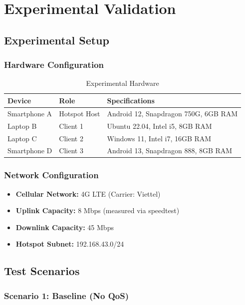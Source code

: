 \chapter{Experimental Validation}
\label{ch:validation}

\section{Experimental Setup}

\subsection{Hardware Configuration}

\begin{table}[htbp]
\centering
\caption{Experimental Hardware}
\begin{tabular}{@{}lll@{}}
\toprule
\textbf{Device} & \textbf{Role} & \textbf{Specifications} \\
\midrule
Smartphone A & Hotspot Host & Android 12, Snapdragon 750G, 6GB RAM \\
Laptop B & Client 1 & Ubuntu 22.04, Intel i5, 8GB RAM \\
Laptop C & Client 2 & Windows 11, Intel i7, 16GB RAM \\
Smartphone D & Client 3 & Android 13, Snapdragon 888, 8GB RAM \\
\bottomrule
\end{tabular}
\end{table}

\subsection{Network Configuration}

\begin{itemize}
    \item \textbf{Cellular Network:} 4G LTE (Carrier: Viettel)
    \item \textbf{Uplink Capacity:} 8 Mbps (measured via speedtest)
    \item \textbf{Downlink Capacity:} 45 Mbps
    \item \textbf{Hotspot Subnet:} 192.168.43.0/24
\end{itemize}

\section{Test Scenarios}

\subsection{Scenario 1: Baseline (No QoS)}

